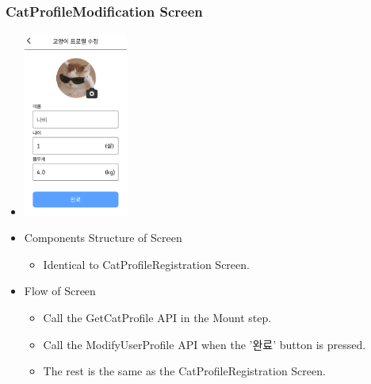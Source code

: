 \documentclass[conference]{IEEEtran}
\begin{document}
\subsubsection{CatProfileModification Screen}
\begin{itemize}
    \item[] \includegraphics[width=0.27\textwidth]{img/D/19.png}
    \item Components Structure of Screen
    \begin{itemize}
        \item Identical to CatProfileRegistration Screen.
    \end{itemize}
    \item Flow of Screen
    \begin{itemize}
        \item Call the GetCatProfile API in the Mount step.
        \item Call the ModifyUserProfile API when the '완료' button is pressed.
        \item The rest is the same as the CatProfileRegistration Screen.
    \end{itemize}
\end{itemize}
\newpage
\end{document}
